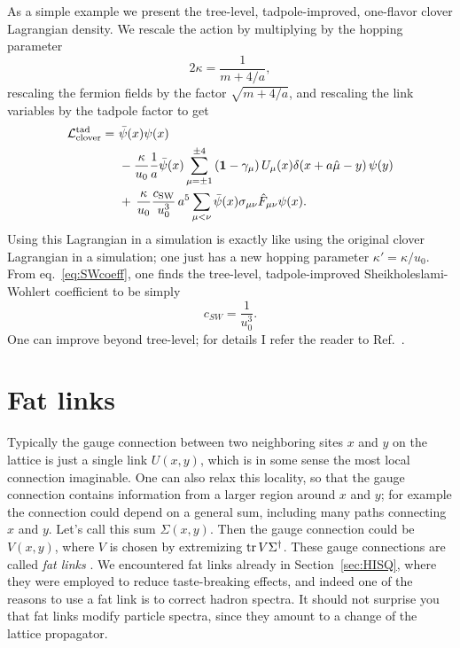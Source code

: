 As a simple example we present the tree-level, tadpole-improved, one-flavor
clover Lagrangian density. We rescale the action by multiplying by 
the hopping parameter
\begin{equation}
  2\kappa=\frac{1}{m+4/a},
\end{equation}
rescaling the fermion fields by the factor $\sqrt{m+4/a}$, and
rescaling the link variables by the tadpole factor to get
\begin{equation}\begin{aligned}
  \mathcal{L}_\text{clover}^\text{tad}=~&\bar{\psi}(x)\psi(x)\\
    &-\frac{\kappa}{u_0}\frac{1}{a}\bar{\psi}(x)
    \sum_{\mu=\pm1}^{\pm4}\left({\mathbf 1}-\gamma_\mu\right)U_\mu(x)
           \delta(x+a\hat{\mu}-y)\,\psi(y)\\
    &+\,\frac{\kappa}{u_0}\frac{c_\text{SW}}{u_0^3}
               \,a^5\sum_{\mu<\nu}\bar{\psi}(x)
                  \sigma_{\mu\nu}\hat{F}_{\mu\nu}\psi(x).
\end{aligned}\end{equation}
Using this Lagrangian in a simulation is exactly like using the original 
clover Lagrangian in a simulation; one just has a new hopping parameter
$\kappa'=\kappa/u_0$. From eq.~\eqref{eq:SWcoeff}, one finds the
tree-level, tadpole-improved Sheikholeslami-Wohlert coefficient to be
simply
\begin{equation}
  c_{SW}=\frac{1}{u_0^3}.
\end{equation}
One can improve beyond tree-level; for details I refer the reader
to Ref.~\cite{degrand_lattice_2006}.

\section{Fat links}

Typically the gauge connection between two neighboring sites $x$ and $y$
on the lattice is just a single link $U(x,y)$, which is in some sense the 
most local connection imaginable. One can also relax this locality, so that 
the gauge connection contains information from a larger region around 
$x$ and $y$; for example the connection could depend on a general sum, 
including many paths connecting $x$ and $y$. Let's call
this sum $\Sigma(x,y)$. Then the gauge connection could be $V(x,y)$,
where $V$ is chosen by extremizing $\tr V\Sigma^\dagger$. These gauge
connections are called {\it fat links} \cite{blum_improving_1997}. 
We encountered fat links
already in Section~\ref{sec:HISQ}, where they were employed to reduce
taste-breaking effects, and indeed one of the reasons to use a fat link
is to correct hadron spectra. It should not surprise you that fat links
modify particle spectra, since they amount to a change of the lattice 
propagator.

